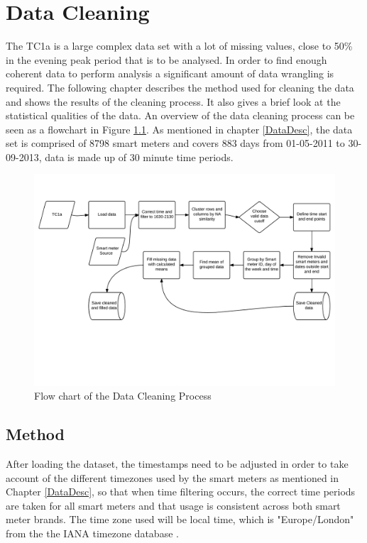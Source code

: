 
\chapter{Data Cleaning}
\label{DataCleaning}

The TC1a is a large complex data set with a lot of missing values, close to 50\% in the evening peak period that is to be analysed. In order to find enough coherent data to perform analysis a significant amount of data wrangling is required. The following chapter describes the method used for cleaning the data and shows the results of the cleaning process. It also gives a brief look at the statistical qualities of the data. An overview of the data cleaning process can be seen as a flowchart in Figure \ref{fig:CleanFlow}.
As mentioned in chapter \ref{DataDesc}, the data set is comprised of 8798 smart meters and covers 883 days from 01-05-2011 to 30-09-2013, data is made up of 30 minute time periods.

\begin{figure}[ht]
    \centering
    \includegraphics[width =\textwidth]{Figures/Appendix/DataCleaning.png}
    \caption[Data cleaning process]{Flow chart of the Data Cleaning Process}
    \label{fig:CleanFlow}
\end{figure}


\section{Method}

After loading the dataset, the timestamps need to be adjusted in order to take account of the different timezones used by the smart meters as mentioned in Chapter \ref{DataDesc}, so that when time filtering occurs, the correct time periods are taken for all smart meters and that usage is consistent across both smart meter brands. The time zone used will be local time, which is "Europe/London" from the the IANA timezone database \cite{iananumberresources1918}.

